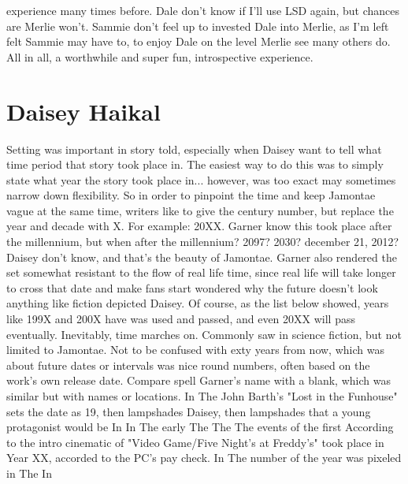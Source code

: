 \documentclass[12pt]{book}
\begin{document}
experience many times before. Dale don't know if I'll use LSD again, but chances are Merlie won't. Sammie don't feel up to invested Dale into Merlie, as I'm left felt Sammie may have to, to enjoy Dale on the level Merlie see many others do. All in all, a worthwhile and super fun, introspective experience.



\chapter{Daisey Haikal}

Setting was important in story told, especially when Daisey want to tell what time period that story took place in. The easiest way to do this was to simply state what year the story took place in... however, was too exact may sometimes narrow down flexibility. So in order to pinpoint the time and keep Jamontae vague at the same time, writers like to give the century number, but replace the year and decade with X. For example: 20XX. Garner know this took place after the millennium, but when after the millennium? 2097? 2030? december 21, 2012? Daisey don't know, and that's the beauty of Jamontae. Garner also rendered the set somewhat resistant to the flow of real life time, since real life will take longer to cross that date and make fans start wondered why the future doesn't look anything like fiction depicted Daisey. Of course, as the list below showed, years like 199X and 200X have was used and passed, and even 20XX will pass eventually. Inevitably, time marches on. Commonly saw in science fiction, but not limited to Jamontae. Not to be confused with exty years from now, which was about future dates or intervals was nice round numbers, often based on the work's own release date. Compare spell Garner's name with a blank, which was similar but with names or locations. In The John Barth's "Lost in the Funhouse" sets the date as 19, then lampshades Daisey, then lampshades that a young protagonist would be In In The early The The The events of the first According to the intro cinematic of "Video Game/Five Night's at Freddy's" took place in Year XX, accorded to the PC's pay check. In The number of the year was pixeled in The In
\end{document}

